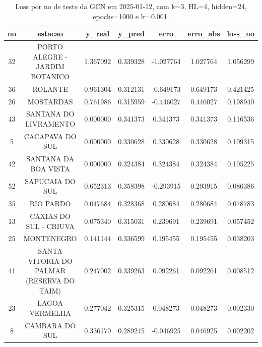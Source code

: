 \begin{table}[h]
\centering
\caption{Loss por no de teste da GCN em 2025-01-12, com k=3, HL=4, hidden=24, epochs=1000 e lr=0.001.}
\label{tab:gcn_loss_k3_hl4_h24_e1000_d20250112}
\begin{tabular}{ccccccc}
\toprule
no & estacao & y\_real & y\_pred & erro & erro\_abs & loss\_no \\
\midrule
32 & PORTO ALEGRE - JARDIM BOTANICO & 1.367092 & 0.339328 & -1.027764 & 1.027764 & 1.056299 \\
36 & ROLANTE & 0.961304 & 0.312131 & -0.649173 & 0.649173 & 0.421425 \\
26 & MOSTARDAS & 0.761986 & 0.315959 & -0.446027 & 0.446027 & 0.198940 \\
43 & SANTANA DO LIVRAMENTO & 0.000000 & 0.341373 & 0.341373 & 0.341373 & 0.116536 \\
5 & CACAPAVA DO SUL & 0.000000 & 0.330628 & 0.330628 & 0.330628 & 0.109315 \\
42 & SANTANA DA BOA VISTA & 0.000000 & 0.324384 & 0.324384 & 0.324384 & 0.105225 \\
52 & SAPUCAIA DO SUL & 0.652313 & 0.358398 & -0.293915 & 0.293915 & 0.086386 \\
35 & RIO PARDO & 0.047684 & 0.328368 & 0.280684 & 0.280684 & 0.078783 \\
13 & CAXIAS DO SUL - CRIUVA & 0.075340 & 0.315031 & 0.239691 & 0.239691 & 0.057452 \\
25 & MONTENEGRO & 0.141144 & 0.336599 & 0.195455 & 0.195455 & 0.038203 \\
41 & SANTA VITORIA DO PALMAR (RESERVA DO TAIM) & 0.247002 & 0.339263 & 0.092261 & 0.092261 & 0.008512 \\
23 & LAGOA VERMELHA & 0.277042 & 0.325315 & 0.048273 & 0.048273 & 0.002330 \\
8 & CAMBARA DO SUL & 0.336170 & 0.289245 & -0.046925 & 0.046925 & 0.002202 \\
\bottomrule
\end{tabular}
\end{table}
